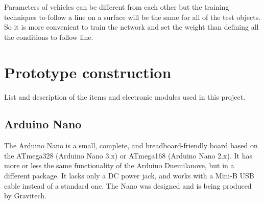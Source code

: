 \documentclass[14pt,a4paper]{extarticle}
\begin{document}
	Parameters of vehicles can be different from each other but the training techniques to follow a line on a surface will be the same for all of the test objects. So it is more convenient to train the network and set the weight than defining all the conditions to follow line.
	
	
	\section{Prototype construction}
	
	List and description of the items and electronic modules used in this project. 
	
	\subsection{Arduino Nano}
	
	The Arduino Nano is a small, complete, and breadboard-friendly board based on the ATmega328 (Arduino Nano 3.x) or ATmega168 (Arduino Nano 2.x). It has more or less the same functionality of the Arduino Duemilanove, but in a different package. It lacks only a DC power jack, and works with a Mini-B USB cable instead of a standard one. The Nano was designed and is being produced by Gravitech.
	
\end{document}
